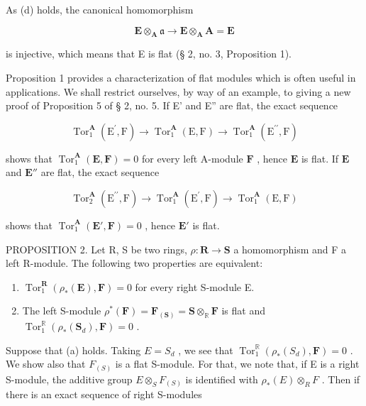 As (d) holds, the canonical homomorphism

\[
\mathbf {E} \otimes_ {\mathbf {A}} \mathfrak {a} \rightarrow \mathbf {E} \otimes_ {\mathbf {A}} \mathbf {A} = \mathbf {E}
\]

is injective, which means that E is flat (§ 2, no. 3, Proposition 1).

Proposition 1 provides a characterization of flat modules which is often useful in applications. We shall restrict ourselves, by way of an example, to giving a new proof of Proposition 5 of § 2, no. 5. If E' and E'' are flat, the exact sequence

\[
\operatorname{Tor} _ {1} ^ {\mathbf {A}} \left(\mathrm{E} ^ {\prime}, \mathrm{F}\right)\rightarrow \operatorname{Tor} _ {1} ^ {\mathbf {A}} (\mathrm{E}, \mathrm{F}) \rightarrow \operatorname{Tor} _ {1} ^ {\mathbf {A}} \left(\mathrm{E} ^ {\prime \prime}, \mathrm{F}\right)
\]

shows that \(\operatorname{Tor}_1^{\mathbf{A}}(\mathbf{E},\mathbf{F}) = 0\) for every left A-module \(\mathbf{F}\) , hence \(\mathbf{E}\) is flat. If \(\mathbf{E}\) and \(\mathbf{E}''\) are flat, the exact sequence

\[
\operatorname{Tor} _ {2} ^ {\mathbf {A}} \left(\mathrm{E} ^ {\prime \prime}, \mathrm{F}\right)\rightarrow \operatorname{Tor} _ {1} ^ {\mathbf {A}} \left(\mathrm{E} ^ {\prime}, \mathrm{F}\right)\rightarrow \operatorname{Tor} _ {1} ^ {\mathbf {A}} (\mathrm{E}, \mathrm{F})
\]

shows that \(\operatorname{Tor}_1^{\mathbf{A}}(\mathbf{E}',\mathbf{F}) = 0\) , hence \(\mathbf{E}'\) is flat.

PROPOSITION 2. Let R, S be two rings, \(\rho: \mathbf{R} \to \mathbf{S}\) a homomorphism and F a left R-module. The following two properties are equivalent:

\begin{enumerate}
\def\labelenumi{(\alph{enumi})}
\item
  \(\operatorname{Tor}_1^{\mathbf{R}}(\rho_*(\mathbf{E}),\mathbf{F}) = 0\) for every right S-module E.
\item
  The left S-module \(\rho^{*}(\mathbf{F}) = \mathbf{F}_{(\mathbf{S})} = \mathbf{S} \otimes_{\mathbb{R}} \mathbf{F}\) is flat and \(\operatorname{Tor}_{1}^{\mathbb{R}}(\rho_{*}(\mathbf{S}_{d}), \mathbf{F}) = 0\) .
\end{enumerate}

Suppose that (a) holds. Taking \(E = S_{d}\) , we see that \(\operatorname{Tor}_{1}^{\mathbb{R}}(\rho_{*}(S_{d}), \mathbf{F}) = 0\) . We show also that \(F_{(S)}\) is a flat S-module. For that, we note that, if E is a right S-module, the additive group \(E \otimes_{S} F_{(S)}\) is identified with \(\rho_{*}(E) \otimes_{R} F\) . Then if there is an exact sequence of right S-modules

